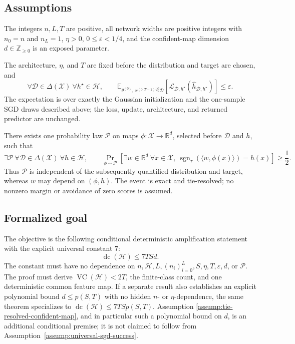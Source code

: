 \subsection{Assumptions}

\begin{assumption}
\label{assump:source-regime}
The integers $n,L,T$ are positive, all network widths are positive integers
with $n_0=n$ and $n_L=1$, $\eta>0$, $0\leq\varepsilon<1/4$, and the
confident-map dimension $d\in\mathbb Z_{\geq0}$ is an exposed parameter.
\end{assumption}

\begin{assumption}
\label{assump:universal-sgd-success}
The architecture, $\eta$, and $T$ are fixed before the distribution and
target are chosen, and
\[
\forall\mathcal D\in\Delta(\mathcal X)\ \forall h^\star\in\mathcal H,
\qquad
\mathbb E_{\theta^{(0)},\,
x^{(0:T-1)}\stackrel{\mathrm{iid}}{\sim}\mathcal D}
\left[
\mathcal L_{\mathcal D,h^\star}
(\widehat h_{\mathcal D,h^\star})
\right]
\leq\varepsilon.
\]
The expectation is over exactly the Gaussian initialization and the one-sample
SGD draws described above; the loss, update, architecture, and returned
predictor are unchanged.
\end{assumption}

\begin{assumption}
\label{assump:tie-resolved-confident-map}
There exists one probability law $\mathcal P$ on maps
$\phi:\mathcal X\to\mathbb R^d$, selected before $\mathcal D$ and $h$, such
that
\[
\exists\mathcal P\ \forall\mathcal D\in\Delta(\mathcal X)\
\forall h\in\mathcal H,
\qquad
\Pr_{\phi\sim\mathcal P}\!\left[
\exists w\in\mathbb R^d\ \forall x\in\mathcal X,
\ \operatorname{sgn}_{\tau}(\langle w,\phi(x)\rangle)=h(x)
\right]\geq\frac12.
\]
Thus $\mathcal P$ is independent of the subsequently quantified distribution
and target, whereas $w$ may depend on $(\phi,h)$.  The event is exact and
tie-resolved; no nonzero margin or avoidance of zero scores is assumed.
\end{assumption}

\subsection{Formalized goal}

The objective is the following conditional deterministic amplification
statement with the explicit universal constant $7$:
\[
\operatorname{dc}(\mathcal H)\leq 7TSd.
\]
The constant must have no dependence on
$n,\mathcal H,L,(n_i)_{i=0}^L,S,\eta,T,\varepsilon,d$, or $\mathcal P$.
The proof must derive $\operatorname{VC}(\mathcal H)<2T$, the finite-class
count, and one deterministic common feature map.  If a separate result also
establishes an explicit polynomial bound $d\leq p(S,T)$ with no hidden
$n$- or $\eta$-dependence, the same theorem specializes to
$\operatorname{dc}(\mathcal H)\leq7TSp(S,T)$.  Assumption
\ref{assump:tie-resolved-confident-map}, and in particular such a polynomial
bound on $d$, is an additional conditional premise; it is not claimed to
follow from Assumption~\ref{assump:universal-sgd-success}.
